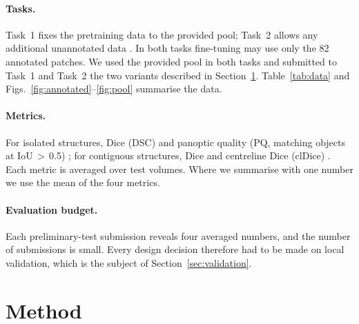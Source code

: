\documentclass[11pt,a4paper]{article}
\begin{document}
\paragraph{Tasks.} Task~1 fixes the pretraining data to the provided pool; Task~2 allows any additional unannotated data \cite{selma3d2026design}. In both tasks fine-tuning may use only the 82 annotated patches. We used the provided pool in both tasks and submitted to Task~1 and Task~2 the two variants described in Section~\ref{sec:method}. Table~\ref{tab:data} and Figs.~\ref{fig:annotated}--\ref{fig:pool} summarise the data.

\paragraph{Metrics.} For isolated structures, Dice (DSC) and panoptic quality (PQ, matching objects at IoU\,$>$\,0.5) \cite{kirillov2019panoptic}; for contiguous structures, Dice and centreline Dice (clDice) \cite{shit2021cldice}. Each metric is averaged over test volumes. Where we summarise with one number we use the mean of the four metrics.

\paragraph{Evaluation budget.} Each preliminary-test submission reveals four averaged numbers, and the number of submissions is small. Every design decision therefore had to be made on local validation, which is the subject of Section~\ref{sec:validation}.

\section{Method}
\label{sec:method}
\end{document}
